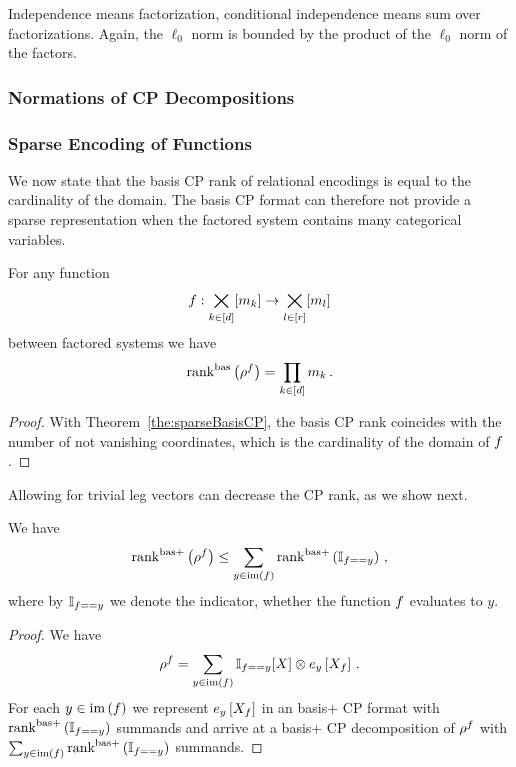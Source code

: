 \begin{example}
	Independence means factorization, conditional independence means sum over factorizations.
	Again, the $\ell_0$ norm is bounded by the product of the $\ell_0$ norm of the factors.
\end{example}


\subsubsection{Normations of CP Decompositions}


\subsubsection{Sparse Encoding of Functions}


We now state that the basis CP rank of relational encodings is equal to the cardinality of the domain.
The basis CP format can therefore not provide a sparse representation when the factored system contains many categorical variables.

\begin{theorem}\label{the:rencodingBasCP}
	For any function
		\[ f : \bigtimes_{k\in[d]}[m_{k}] \rightarrow  \bigtimes_{l\in[r]}[m_{l}] \]
	between factored systems we have
		\[ \mathrm{rank}^{\mathrm{bas}}\left(\rho^{f}\right) =  \prod_{k\in[d]}m_{k} \, . \]
\end{theorem}
\begin{proof}
	With Theorem~\ref{the:sparseBasisCP}, the basis CP rank coincides with the number of not vanishing coordinates, which is the cardinality of the domain of $f$.
\end{proof}

Allowing for trivial leg vectors can decrease the CP rank, as we show next.

\begin{theorem}
	We have
		\[ \mathrm{rank}^{\mathrm{bas+}}\left(\rho^{f}\right) \leq  \sum_{y \in \mathrm{im}\left(f\right)} \mathrm{rank}^{\mathrm{bas+}}\left(\mathbb{I}_{f == y} \right) \, , \]
	where by $\mathbb{I}_{f == y} $ we denote the indicator, whether the function $f$ evaluates to $y$.
\end{theorem}
\begin{proof}
	We have
		\[ \rho^{f} = \sum_{y \in \mathrm{im}\left(f\right)} \mathbb{I}_{f == y}[X]  \otimes e_{y}\left[X_{f}\right] \, . \]
	For each $y \in \mathrm{im}\left(f\right)$ we represent $e_{y}\left[X_{f}\right]$ in an basis+ CP format with $\mathrm{rank}^{\mathrm{bas+}}\left(\mathbb{I}_{f == y} \right) $ summands and arrive at a basis+ CP decomposition of $\rho^{f}$ with $\sum_{y \in \mathrm{im}\left(f\right)} \mathrm{rank}^{\mathrm{bas+}}\left(\mathbb{I}_{f == y} \right) $ summands.
\end{proof}

